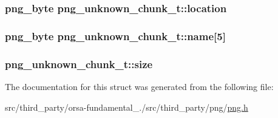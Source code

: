 \subsubsection[{location}]{\setlength{\rightskip}{0pt plus 5cm}png\+\_\+byte png\+\_\+unknown\+\_\+chunk\+\_\+t\+::location}\label{structpng__unknown__chunk__t_af56bfc32223b97fbcb6bd29ba7a1cc29}
\hypertarget{structpng__unknown__chunk__t_aed965186b30a6f15541d20d7dd8a6849}{}
\subsubsection[{name}]{\setlength{\rightskip}{0pt plus 5cm}png\+\_\+byte png\+\_\+unknown\+\_\+chunk\+\_\+t\+::name\mbox{[}5\mbox{]}}\label{structpng__unknown__chunk__t_aed965186b30a6f15541d20d7dd8a6849}
\hypertarget{structpng__unknown__chunk__t_a0a691245e0c04f01ecf767f215b6a652}{}
\subsubsection[{size}]{ png\+\_\+unknown\+\_\+chunk\+\_\+t\+::size}\label{structpng__unknown__chunk__t_a0a691245e0c04f01ecf767f215b6a652}


The documentation for this struct was generated from the following file\+:\begin{DoxyCompactItemize}
\item 
src/third\+\_\+party/orsa-\/fundamental\+\_./src/third\+\_\+party/png/\hyperlink{png_8h}{png.\+h}\end{DoxyCompactItemize}
